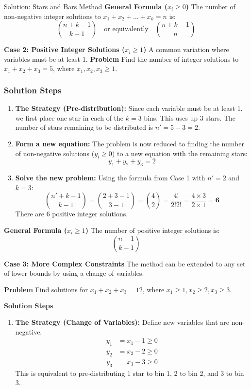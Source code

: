 \begin{solutionboxbreak}{Solution: Stars and Bars Method}
\textbf{General Formula ($x_i \ge 0$)}
The number of non-negative integer solutions to $x_1 + x_2 + \dots + x_k = n$ is:
\[
\binom{n+k-1}{k-1} \quad \text{or equivalently} \quad \binom{n+k-1}{n}
\]

\textbf{Case 2: Positive Integer Solutions ($x_i \ge 1$)}
A common variation where variables must be at least 1.
\textbf{Problem}
Find the number of integer solutions to $x_1 + x_2 + x_3 = 5$, where $x_1, x_2, x_3 \ge 1$.

\subsubsection*{Solution Steps}
\begin{enumerate}
    \item \textbf{The Strategy (Pre-distribution):} Since each variable must be at least 1, we first place one star in each of the $k=3$ bins. This uses up 3 stars. The number of stars remaining to be distributed is $n' = 5 - 3 = 2$.
    
    \item \textbf{Form a new equation:} The problem is now reduced to finding the number of non-negative solutions ($y_i \ge 0$) to a new equation with the remaining stars:
    \[
    y_1 + y_2 + y_3 = 2
    \]
    
    \item \textbf{Solve the new problem:} Using the formula from Case 1 with $n'=2$ and $k=3$:
    \[
    \binom{n'+k-1}{k-1} = \binom{2+3-1}{3-1} = \binom{4}{2} = \frac{4!}{2!2!} = \frac{4 \times 3}{2 \times 1} = \mathbf{6}
    \]
    There are 6 positive integer solutions.
\end{enumerate}

\textbf{General Formula ($x_i \ge 1$)}
The number of positive integer solutions is:
\[
\binom{n-1}{k-1}
\]

\textbf{Case 3: More Complex Constraints}
The method can be extended to any set of lower bounds by using a change of variables.

\textbf{Problem}
Find solutions for $x_1 + x_2 + x_3 = 12$, where $x_1 \ge 1, x_2 \ge 2, x_3 \ge 3$.

\textbf{Solution Steps}
\begin{enumerate}
    \item \textbf{The Strategy (Change of Variables):} Define new variables that are non-negative.
    \begin{align*}
        y_1 &= x_1 - 1 \ge 0 \\
        y_2 &= x_2 - 2 \ge 0 \\
        y_3 &= x_3 - 3 \ge 0
    \end{align*}
    This is equivalent to pre-distributing 1 star to bin 1, 2 to bin 2, and 3 to bin 3.
    

\end{enumerate}
\end{solutionboxbreak}
